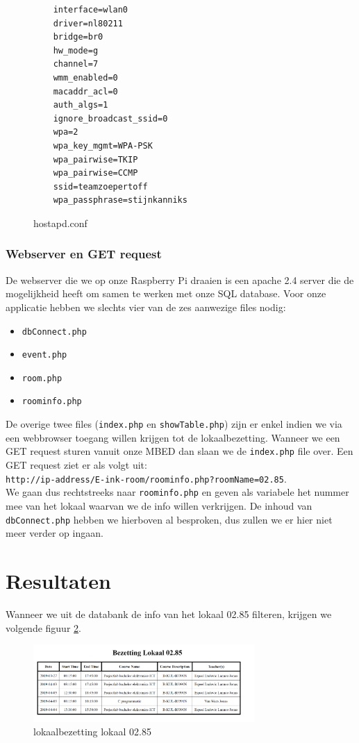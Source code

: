 \documentclass[a4paper,kul]{kulakarticle} %
\begin{document}
\begin{figure}[!h]
	\begin{verbatim}
	interface=wlan0
	driver=nl80211
	bridge=br0
	hw_mode=g
	channel=7
	wmm_enabled=0
	macaddr_acl=0
	auth_algs=1
	ignore_broadcast_ssid=0
	wpa=2
	wpa_key_mgmt=WPA-PSK
	wpa_pairwise=TKIP
	wpa_pairwise=CCMP
	ssid=teamzoepertoff
	wpa_passphrase=stijnkanniks
	\end{verbatim}
	\caption{hostapd.conf}
	\label{fig:hostapd}
\end{figure}
\newpage
\subsubsection{Webserver en GET request}
De webserver die we op onze Raspberry Pi draaien is een apache 2.4 server die de mogelijkheid heeft om samen te werken met onze SQL database. Voor onze applicatie hebben we slechts vier van de zes aanwezige files nodig: 
\begin{itemize}
	\item \verb|dbConnect.php|
	\item \verb|event.php|
	\item \verb|room.php|
	\item \verb|roominfo.php|
\end{itemize}
De overige twee files (\verb|index.php| en \verb|showTable.php|) zijn er enkel indien we via een webbrowser toegang willen krijgen tot de lokaalbezetting. Wanneer we een GET request sturen vanuit onze MBED dan slaan we de \verb|index.php| file over. Een GET request ziet er als volgt uit: \\ \verb|http://ip-address/E-ink-room/roominfo.php?roomName=02.85|. \\ We gaan dus rechtstreeks naar \verb|roominfo.php| en geven als variabele het nummer mee van het lokaal waarvan we de info willen verkrijgen.  De inhoud van \verb|dbConnect.php| hebben we hierboven al besproken, dus zullen we er hier niet meer verder op ingaan.
\newpage

\section{Resultaten}

Wanneer we uit de databank de info van het lokaal 02.85 filteren, krijgen we volgende figuur \ref{fig:vboutput}.

\begin{figure}
	\centering
	\includegraphics[width=0.75\textwidth]{vbDatabank}
	\caption{lokaalbezetting lokaal 02.85}
	\label{fig:vboutput}
\end{figure}
	
\end{document}
